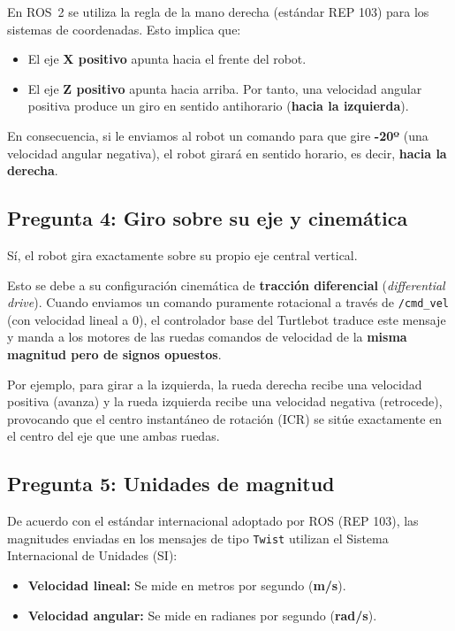 En ROS~2 se utiliza la regla de la mano derecha (estándar REP 103) para los sistemas de coordenadas. Esto implica que:
\begin{itemize}
	\item El eje \textbf{X positivo} apunta hacia el frente del robot.
	\item El eje \textbf{Z positivo} apunta hacia arriba. Por tanto, una velocidad angular positiva produce un giro en sentido antihorario (\textbf{hacia la izquierda}).
\end{itemize}

En consecuencia, si le enviamos al robot un comando para que gire \textbf{-20º} (una velocidad angular negativa), el robot girará en sentido horario, es decir, \textbf{hacia la derecha}.

\subsection*{Pregunta 4: Giro sobre su eje y cinemática}

Sí, el robot gira exactamente sobre su propio eje central vertical. 

Esto se debe a su configuración cinemática de \textbf{tracción diferencial} (\textit{differential drive}). Cuando enviamos un comando puramente rotacional a través de \texttt{/cmd\_vel} (con velocidad lineal a 0), el controlador base del Turtlebot traduce este mensaje y manda a los motores de las ruedas comandos de velocidad de la \textbf{misma magnitud pero de signos opuestos}. 

Por ejemplo, para girar a la izquierda, la rueda derecha recibe una velocidad positiva (avanza) y la rueda izquierda recibe una velocidad negativa (retrocede), provocando que el centro instantáneo de rotación (ICR) se sitúe exactamente en el centro del eje que une ambas ruedas.

\subsection*{Pregunta 5: Unidades de magnitud}

De acuerdo con el estándar internacional adoptado por ROS (REP 103), las magnitudes enviadas en los mensajes de tipo \texttt{Twist} utilizan el Sistema Internacional de Unidades (SI):
\begin{itemize}
	\item \textbf{Velocidad lineal:} Se mide en metros por segundo (\textbf{m/s}).
	\item \textbf{Velocidad angular:} Se mide en radianes por segundo (\textbf{rad/s}).
\end{itemize}

